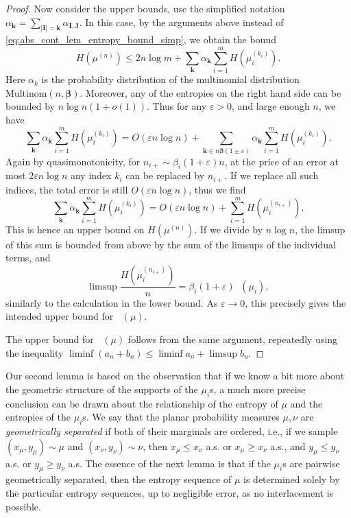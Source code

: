 \documentclass[11pt]{article}
\newcommand{\uppersupent}{\mathop{\overline{H}^{\mathrm{superlin}}}}
\newcommand{\lowersupent}{\mathop{\underline{H}^{\mathrm{superlin}}}}
\theoremstyle{definition}
\begin{document}
\begin{proof}
    Now consider the upper bounds, use the simplified notation
    $\alpha_{\mathbf{k}} = \sum_{|\mathbf{I}|=\mathbf{k}}\alpha_{\mathbf{I}, \mathbf{J}}$. 
    In this case, by the arguments above instead of \eqref{eq:abs_cont_lem_entropy_bound_simp}, we obtain the bound
    \begin{displaymath}
        H(\mu^{(n)})\leq 2n\log m + \sum_{\mathbf{k}} \alpha_{\mathbf{k}}\sum_{i=1}^m H(\mu_i^{(k_i)}).
    \end{displaymath}
    Here $\alpha_k$ is the probability distribution of the multinomial distribution $\mathrm{Multinom}(n, \mathbf{\beta})$. Moreover, any of the entropies on the right hand side can be bounded by $n\log n (1+o(1))$. Thus for any $\varepsilon>0$, and large enough $n$, we have
    $$\sum_{\mathbf{k}} \alpha_{\mathbf{k}}\sum_{i=1}^m H(\mu_i^{(k_i)}) =
    O(\varepsilon n\log n) + \sum_{\mathbf{k}\in n\mathbf{\beta}(1\pm\varepsilon)}\alpha_{\mathbf{k}}\sum_{i=1}^m H(\mu_i^{(k_i)}).$$
    Again by quasimonotonicity, for $n_{i+}\sim \beta_i(1+\varepsilon)n$,
    at the price of an error at most $2\varepsilon n\log n$ any index $k_i$ can be replaced by $n_{i+}$. If we replace all such indices, the total error is still $O(\varepsilon n\log n)$, thus we find
    \begin{equation} \label{eq:concise_entropy_convex_comb}
    \sum_{\mathbf{k}} \alpha_{\mathbf{k}}\sum_{i=1}^m H(\mu_i^{(k_i)}) = O(\varepsilon n\log n) + \sum_{i=1}^{m}H(\mu_i^{(n_{i+})}).
    \end{equation}
    This is hence an upper bound on $H(\mu^{(n)})$. If we divide by $n\log n$, the limsup of this sum is bounded from above by the sum of the limsups of the individual terms, and
    $$\limsup\frac{H(\mu_i^{(n_{i+})})}{n}=\beta_i(1+\varepsilon)\uppersupent(\mu_i),$$
    similarly to the calculation in the lower bound. As $\varepsilon\to 0$, this precisely gives the intended upper bound for $\uppersupent(\mu)$.
    
    The upper bound for $\lowersupent(\mu)$ follows from the same argument, repeatedly using the inequality $\liminf (a_n + b_n)\leq \liminf a_n + \limsup b_n.$
\end{proof}

Our second lemma is based on the observation that if we know a bit more about the geometric structure of the supports of the $\mu_i$s, a much more precise conclusion can be drawn about the relationship of the entropy of $\mu$ and the entropies of the $\mu_i$s. We say that the planar probability measures $\mu, \nu$ are \textit{geometrically separated} if both of their marginals are ordered, i.e., if we sample $(x_\mu, y_\mu)\sim \mu$ and $(x_\nu, y_\nu)\sim \nu$, then $x_\mu\leq x_\nu$ a.s. or $x_\mu\geq x_\nu$ a.s., and $y_\mu\leq y_\nu$ a.s. or $y_\mu\geq y_\nu$ a.s. The essence of the next lemma is that if the $\mu_i$s are pairwise geometrically separated, then the entropy sequence of $\mu$ is determined solely by the particular entropy sequences, up to negligible error, as no interlacement is possible.
\end{document}
